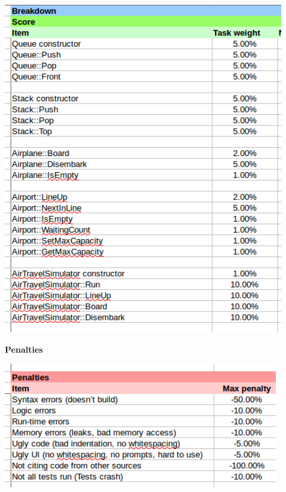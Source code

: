 \documentclass[a4paper,12pt,oneside]{book}
\begin{document}
    \begin{center}
        \includegraphics[height=14.5cm]{images/gradesheet-project2.png}
    \end{center}

    \newpage
    \textbf{Penalties}
    
    \begin{center}
        \includegraphics[width=12cm]{images/gradesheet-project2-penalties.png}
    \end{center}
\end{document}
